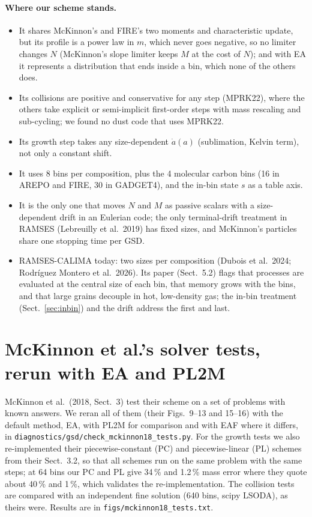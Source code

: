 \documentclass[11pt,a4paper]{article}
\begin{document}
\paragraph{Where our scheme stands.}
\begin{itemize}
\item It shares McKinnon's and FIRE's two moments and characteristic update, but its profile is a power law in $m$,
  which never goes negative, so no limiter changes $N$ (McKinnon's slope limiter keeps $M$ at the cost of $N$); and
  with EA it represents a distribution that ends inside a bin, which none of the others does.
\item Its collisions are positive and conservative for any step (MPRK22), where the others take explicit or
  semi-implicit first-order steps with mass rescaling and sub-cycling; we found no dust code that uses MPRK22.
\item Its growth step takes any size-dependent $\dot a(a)$ (sublimation, Kelvin term), not only a constant shift.
\item It uses 8 bins per composition, plus the 4 molecular carbon bins (16 in AREPO and FIRE, 30 in GADGET4), and the in-bin state $s$ as a table axis.
\item It is the only one that moves $N$ and $M$ as passive scalars with a size-dependent drift in an Eulerian code;
  the only terminal-drift treatment in RAMSES (Lebreuilly et al.\ 2019) has fixed sizes, and McKinnon's particles
  share one stopping time per GSD.
\item RAMSES-CALIMA today: two sizes per composition (Dubois et al.\ 2024; Rodr\'iguez Montero et al.\ 2026). Its paper
  (Sect.~5.2) flags that processes are evaluated at the central size of each bin, that memory grows with the bins, and
  that large grains decouple in hot, low-density gas; the in-bin treatment (Sect.~\ref{sec:inbin}) and the drift
  address the first and last.
\end{itemize}

\section{McKinnon et al.'s solver tests, rerun with EA and PL2M}\label{sec:mck}

McKinnon et al.\ (2018, Sect.~3) test their scheme on a set of problems with known answers. We reran all of them
(their Figs.~9--13 and 15--16) with the default method, EA, with PL2M for comparison and with EAF where it differs,
in
\texttt{diagnostics/gsd/check\_mckinnon18\_tests.py}. For the growth tests we also re-implemented their
piecewise-constant (PC) and piecewise-linear (PL) schemes from their Sect.~3.2, so that all schemes run on the same
problem with the same steps; at 64 bins our PC and PL give 34\,\% and 1.2\,\% mass
error where they quote about 40\,\% and 1\,\%, which validates the re-implementation. The collision tests are compared
with an independent fine solution (640 bins, scipy LSODA), as theirs were. Results are in
\texttt{figs/mckinnon18\_tests.txt}.
\end{document}
